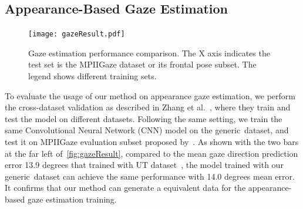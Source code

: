 
\subsection{Appearance-Based Gaze Estimation}





\begin{figure}
    \centering
    \texttt{[image: gazeResult.pdf]}
    \caption{Gaze estimation performance comparison. The X axis indicates the test set is the MPIIGaze dataset or its frontal pose subset. The legend shows different training sets.}
    \label{fig:gazeResult}
\end{figure}

To evaluate the usage of our method on appearance gaze estimation, we perform the cross-dataset validation as described in Zhang et al.~\cite{zhang15_cvpr}, where they train and test the model on different datasets. Following the same setting, we train the same Convolutional Neural Network (CNN) model on the generic~\dataset dataset, and test it on MPIIGaze evaluation subset proposed by~\cite{zhang15_cvpr}. As shown with the two bars at the far left of~\autoref{fig:gazeResult}, compared to the mean gaze direction prediction error 13.9 degrees that trained with UT dataset~\cite{sugano2014learning}, the model trained with our generic~\dataset dataset can achieve the same performance with 14.0 degrees mean error. It confirms that our method can generate a equivalent data for the appearance-based gaze estimation training.

